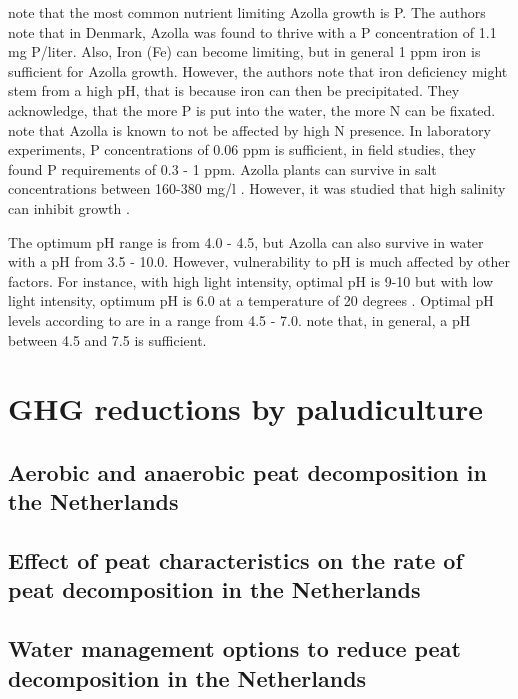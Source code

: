 {\citet{lumpkin1980azolla} note that the most common nutrient limiting Azolla growth is P. The authors note that in Denmark, Azolla was found to thrive with a P concentration of 1.1 mg P/liter. Also, Iron (Fe) can become limiting, but in general 1 ppm iron is  sufficient for Azolla growth. However, the authors note that iron deficiency might stem from a high pH, that is because iron can then be precipitated. They acknowledge, that the more P is put into the water, the more N can be fixated. \citet{sabetraftar2013review} note that Azolla is known to not be affected by high N presence. In laboratory experiments, P concentrations of 0.06 ppm is sufficient, in field studies, they found P requirements of 0.3 - 1 ppm. Azolla plants can survive in salt concentrations between 160-380 mg/l  \citep{lumpkin1980azolla}. However, it was studied that high salinity can inhibit growth \citep{sabetraftar2013review, lumpkin1980azolla}. 

The optimum pH range is from 4.0 - 4.5, but Azolla can also survive in water with a pH from 3.5 - 10.0. However, vulnerability to pH is much affected by other factors. For instance, with high light intensity, optimal pH is 9-10 but with low light intensity, optimum pH is 6.0 at a temperature of 20 degrees \citep{wagner1997azolla}. Optimal pH levels according to \citet{lumpkin1980azolla} are in a range from 4.5 - 7.0. \citet{sabetraftar2013review} note that, in general, a pH between 4.5 and 7.5 is sufficient.


\chapter{GHG reductions by paludiculture}

\section{Aerobic and anaerobic peat decomposition in the Netherlands}

\section{Effect of peat characteristics on the rate of peat decomposition in the Netherlands}

\section{Water management options to reduce peat decomposition in the Netherlands}


}
